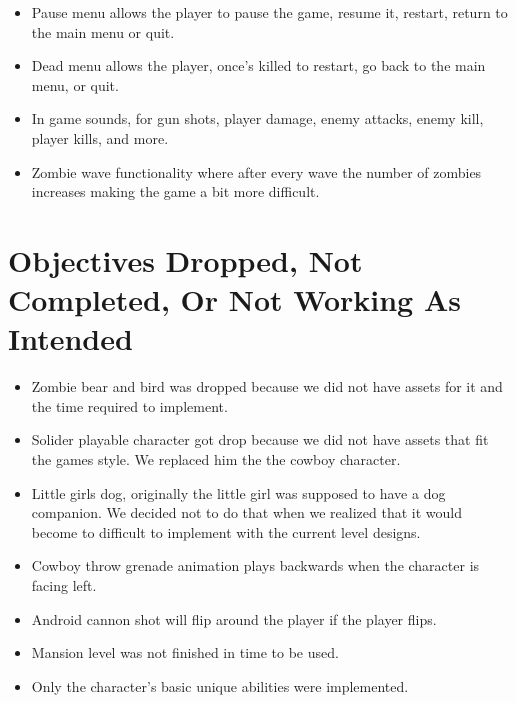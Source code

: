 \documentclass{article}
\begin{document}
\begin{itemize}
\item Pause menu allows the player to pause the game, resume it, restart, return to the main menu or quit. 

\item Dead menu allows the player, once's killed to restart, go back to the main menu, or quit. 

\item In game sounds, for gun shots, player damage, enemy attacks, enemy kill, player kills, and more. 

\item Zombie wave functionality where after every wave the number of zombies increases making the game a bit more difficult.



\end{itemize}

\section{Objectives Dropped, Not Completed, Or Not Working As Intended}
\begin{itemize}
\item Zombie bear and bird was dropped because we did not have assets for it and the time required to implement. 

\item Solider playable character got drop because we did not have assets that fit the games style.  We replaced him the the cowboy character. 

\item Little girls dog, originally the little girl was supposed to have a dog companion. We decided not to do that when we realized that it would become to difficult to implement with the current level designs. 

\item Cowboy throw grenade animation plays backwards when the character is facing left.

\item Android cannon shot will flip around the player if the player flips. 

\item Mansion level was not finished in time to be used.

\item Only the character's basic unique abilities were implemented.


\end{itemize}
\end{document}
